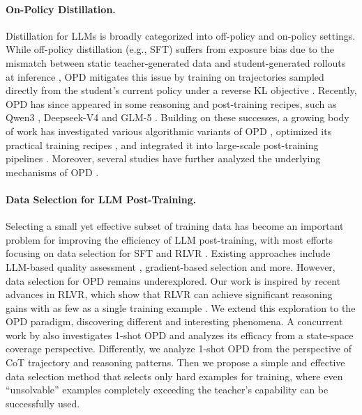 \paragraph{On-Policy Distillation.} Distillation for LLMs is broadly categorized into off-policy and on-policy settings. While off-policy distillation (e.g., SFT) suffers from exposure bias due to the mismatch between static teacher-generated data and student-generated rollouts at inference \citep{agarwal2024policy}, OPD mitigates this issue by training on trajectories sampled directly from the student's current policy under a reverse KL objective \citep{gu2024minillm}. Recently, OPD has since appeared in some reasoning and post-training recipes, such as Qwen3 \citep{yang2025qwen3}, Deepseek-V4 \citep{xu2026deepseek} and GLM-5 \citep{zeng2026glm}. Building on these successes, a growing body of work has investigated various algorithmic variants of OPD \citep{oh2026kl, yang2026prune}, optimized its practical training recipes \citep{li2026filter, ko2026scaling}, and integrated it into large-scale post-training pipelines \citep{ma2026mopd}. Moreover, several studies have further analyzed the underlying mechanisms of OPD \citep{wang2026not, li2026rethinking}. 

\paragraph{Data Selection for LLM Post-Training.} Selecting a small yet effective subset of training data has become an important problem for improving the efficiency of LLM post-training, with most efforts focusing on data selection for SFT \citep{ivison2025large} and RLVR \citep{wu2026single}. Existing approaches include LLM-based quality assessment \citep{chen2024alpagasus}, gradient-based selection \citep{xia2024less} and more. However, data selection for OPD remains underexplored. Our work is inspired by recent advances in RLVR, which show that RLVR can achieve significant reasoning gains with as few as a single training example \citep{wang2026reinforcement}. We extend this exploration to the OPD paradigm, discovering different and interesting phenomena. A concurrent work by \citet{fu2026rethinking} also investigates 1-shot OPD and analyzes its efficacy from a state-space coverage perspective. Differently, we analyze 1-shot OPD from the perspective of CoT trajectory and reasoning patterns. Then we propose a simple and effective data selection method that selects only hard examples for training, where even ``unsolvable'' examples completely exceeding the teacher's capability can be successfully used.
